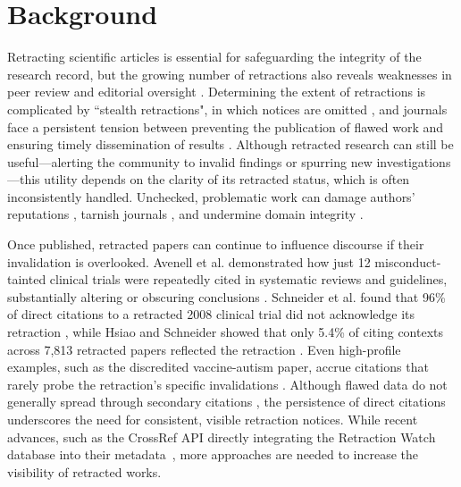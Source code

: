 \documentclass[pdflatex,sn-mathphys-num]{sn-jnl}%
\begin{document}
\section{Background}\label{sec1}

Retracting scientific articles is essential for safeguarding the integrity of the research record, but the growing number of retractions also reveals weaknesses in peer review and editorial oversight \cite{steen_retractions_2011-1, steen_retractions_2011,Steen2013-rr, Kuhberger2022-if}. Determining the extent of retractions is complicated by ``stealth retractions", in which notices are omitted \cite{teixeira_da_silva_silent_2016}, and journals face a persistent tension between preventing the publication of flawed work and ensuring timely dissemination of results \cite{perera_recent_2017}. Although retracted research can still be useful—alerting the community to invalid findings or spurring new investigations—this utility depends on the clarity of its retracted status, which is often inconsistently handled. Unchecked, problematic work can damage authors' reputations \cite{kearney_research_2024}, tarnish journals \cite{congiunti_ethics_2023, collaborative_working_group_from_the_conference_keeping_the_pool_clean_prevention_and_management_of_misconduct_related_retractions_repair_2018}, and undermine domain integrity \cite{Grey2024}.

Once published, retracted papers can continue to influence discourse if their invalidation is overlooked. Avenell et al. demonstrated how just 12 misconduct-tainted clinical trials were repeatedly cited in systematic reviews and guidelines, substantially altering or obscuring conclusions \cite{Avenelle031909}. Schneider et al. found that 96\% of direct citations to a retracted 2008 clinical trial did not acknowledge its retraction \cite{schneider_continued_2020}, while Hsiao and Schneider showed that only 5.4\% of citing contexts across 7,813 retracted papers reflected the retraction \cite{10.1162/qss_a_00155}. Even high-profile examples, such as the discredited vaccine-autism paper, accrue citations that rarely probe the retraction’s specific invalidations \cite{heibi_qualitative_2021}. Although flawed data do not generally spread through secondary citations \cite{van_der_vet_propagation_2016}, the persistence of direct citations underscores the need for consistent, visible retraction notices. While recent advances, such as the CrossRef API directly integrating the Retraction Watch database into their metadata~\cite{rittman_retraction_2025}, more approaches are needed to increase the visibility of retracted works.
\end{document}
